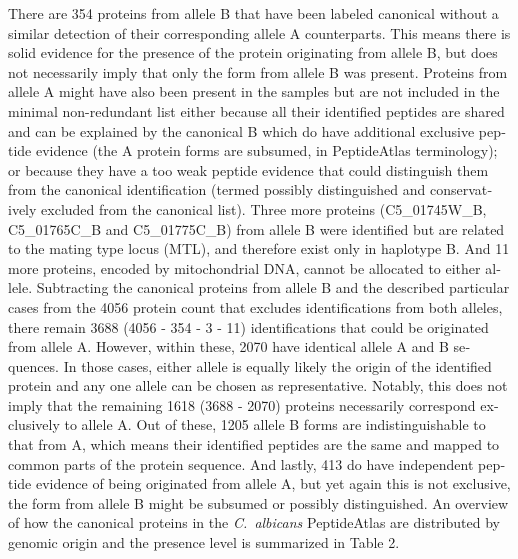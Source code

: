 \begin{otherlanguage}{british}
There are 354 proteins from allele B that have been labeled canonical without a similar
detection of their corresponding allele A counterparts. This means there is solid evidence for
the presence of the protein originating from allele B, but does not necessarily imply that only
the form from allele B was present. Proteins from allele A might have also been present in
the samples but are not included in the minimal non-redundant list either because all their
identified peptides are shared and can be explained by the canonical B which do have
additional exclusive peptide evidence (the A protein forms are subsumed, in PeptideAtlas
terminology); or because they have a too weak peptide evidence that could distinguish them
from the canonical identification (termed possibly distinguished and conservatively excluded
from the canonical list).
Three more proteins (C5\_01745W\_B, C5\_01765C\_B and C5\_01775C\_B) from allele B were
identified but are related to the mating type locus (MTL), and therefore exist only in haplotype
B. And 11 more proteins, encoded by mitochondrial DNA, cannot be allocated to either allele.
Subtracting the canonical proteins from allele B and the described particular cases from the
4056 protein count that excludes identifications from both alleles, there remain 3688 (4056 -
354 - 3 - 11) identifications that could be originated from allele A. However, within these,
2070 have identical allele A and B sequences. In those cases, either allele is equally likely
the origin of the identified protein and any one allele can be chosen as representative.
Notably, this does not imply that the remaining 1618 (3688 - 2070) proteins necessarily
correspond exclusively to allele A. Out of these, 1205 allele B forms are indistinguishable to
that from A, which means their identified peptides are the same and mapped to common
parts of the protein sequence. And lastly, 413 do have independent peptide evidence of being
originated from allele A, but yet again this is not exclusive, the form from allele B might be
subsumed or possibly distinguished. An overview of how the canonical proteins in the
\textit{\mbox{C. albicans}} PeptideAtlas are distributed by genomic origin and the presence level is
summarized in Table 2.


\end{otherlanguage}
